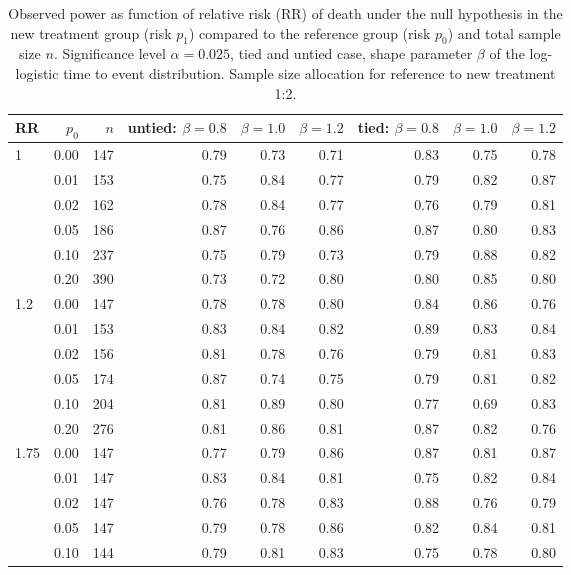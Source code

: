\documentclass[bimj,fleqn]{w-art}\usepackage[]{graphicx}\usepackage[]{color}
\theoremstyle{plain}
\theoremstyle{definition}
\begin{document}
\begin{table}[ht]
\centering
\caption{Observed power as function of relative risk
             (RR) of death under the null hypothesis in the new treatment group
             (risk $p_1$) compared to the reference group (risk $p_0$) and total
             sample size $n$.
             Significance level $\alpha =0.025$, tied and untied case,
             shape parameter $\beta$ of the log-logistic time to event
             distribution. Sample size allocation for reference to new treatment 1:2. } 
\label{tab:simresult}
\begin{tabular}{lrrrrrrrr}
  \hline
RR & $p_0$ & $n$ & untied: $\beta = 0.8$ & $\beta = 1.0$ & $\beta = 1.2$ & tied: $\beta = 0.8$ & $\beta = 1.0$ & $\beta = 1.2$ \\ 
  \hline
1 & 0.00 & 147 & 0.79 & 0.73 & 0.71 & 0.83 & 0.75 & 0.78 \\ 
    & 0.01 & 153 & 0.75 & 0.84 & 0.77 & 0.79 & 0.82 & 0.87 \\ 
    & 0.02 & 162 & 0.78 & 0.84 & 0.77 & 0.76 & 0.79 & 0.81 \\ 
    & 0.05 & 186 & 0.87 & 0.76 & 0.86 & 0.87 & 0.80 & 0.83 \\ 
    & 0.10 & 237 & 0.75 & 0.79 & 0.73 & 0.79 & 0.88 & 0.82 \\ 
    & 0.20 & 390 & 0.73 & 0.72 & 0.80 & 0.80 & 0.85 & 0.80 \\ 
  1.2 & 0.00 & 147 & 0.78 & 0.78 & 0.80 & 0.84 & 0.86 & 0.76 \\ 
    & 0.01 & 153 & 0.83 & 0.84 & 0.82 & 0.89 & 0.83 & 0.84 \\ 
    & 0.02 & 156 & 0.81 & 0.78 & 0.76 & 0.79 & 0.81 & 0.83 \\ 
    & 0.05 & 174 & 0.87 & 0.74 & 0.75 & 0.79 & 0.81 & 0.82 \\ 
    & 0.10 & 204 & 0.81 & 0.89 & 0.80 & 0.77 & 0.69 & 0.83 \\ 
    & 0.20 & 276 & 0.81 & 0.86 & 0.81 & 0.87 & 0.82 & 0.76 \\ 
  1.75 & 0.00 & 147 & 0.77 & 0.79 & 0.86 & 0.87 & 0.81 & 0.87 \\ 
    & 0.01 & 147 & 0.83 & 0.84 & 0.81 & 0.75 & 0.82 & 0.84 \\ 
    & 0.02 & 147 & 0.76 & 0.78 & 0.83 & 0.88 & 0.76 & 0.79 \\ 
    & 0.05 & 147 & 0.79 & 0.78 & 0.86 & 0.82 & 0.84 & 0.81 \\ 
    & 0.10 & 144 & 0.79 & 0.81 & 0.83 & 0.75 & 0.78 & 0.80 \\ 

\end{tabular}
\end{table}
\end{document}
